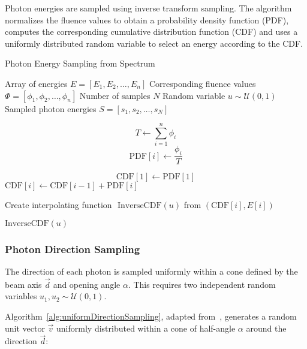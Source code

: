 Photon energies are sampled using inverse transform sampling. The algorithm
normalizes the fluence values to obtain a probability density function (PDF),
computes the corresponding cumulative distribution function (CDF) and uses a
uniformly distributed random variable to select an energy according to the CDF.

\begin{algorithm}[H]
\caption{Photon Energy Sampling from Spectrum}
\label{alg:photonEnergySampling}
\begin{algorithmic}[1]
\Require Array of energies $E = [E_1, E_2, \dots, E_n]$ 
\Require Corresponding fluence values $\Phi = [\phi_1, \phi_2, \dots, \phi_n]$ 
\Require Number of samples $N$ 
\Require Random variable $u \sim \mathcal{U}(0, 1)$ \Ensure Sampled photon
energies $S = [s_1, s_2, \dots, s_N]$

 \State $$T \gets \sum_{i=1}^{n} \phi_i$$
\State $$\text{PDF}[i] \gets \frac{\phi_i}{T}$$

\State $$\text{CDF}[1] \gets \text{PDF}[1]$$ 
\State $\text{CDF}[i] \gets \text{CDF}[i-1] + \text{PDF}[i]$ 
\EndFor


\State Create interpolating function $\text{ InverseCDF}(u)$ from
$(\text{CDF}[i], E[i])$

\State \Return $\text{InverseCDF}(u)$

\end{algorithmic}
\end{algorithm}

\subsubsection{Photon Direction Sampling}

The direction of each photon is sampled uniformly within a cone defined by the
beam axis $\vec{d}$ and opening angle $\alpha$. This requires two independent
random variables $u_1, u_2 \sim \mathcal{U}(0, 1)$.

Algorithm~\ref{alg:uniformDirectionSampling}, adapted
from~\cite{venkatapathi2021n}, generates a random unit vector $\vec{v}$
uniformly distributed within a cone of half-angle $\alpha$ around the direction
$\vec{d}$:

